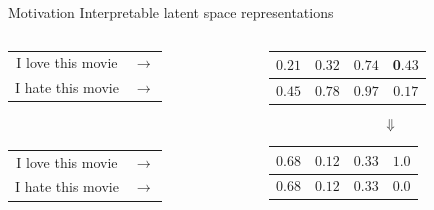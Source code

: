 \documentclass{beamer}
\begin{document}
\begin{frame}{Motivation}
  \centering
  {\LARGE Interpretable latent space representations} \\
  \vspace{1cm}
  \begin{columns}[T] %
    \begin{column}{.3\textwidth}
      \centering
      \begin{tabular}{ c c }
        I love this movie & $\rightarrow$ \\
        I hate this movie & $\rightarrow$ \\
      \end{tabular}\\
      \vspace{1.8cm}
      \begin{tabular}{ c c }
        I love this movie & $\rightarrow$ \\
        I hate this movie & $\rightarrow$ \\
      \end{tabular}
    \end{column}
    \hfill
    \begin{column}{.6\textwidth}
      \centering
      \begin{tabular}{ | c | c | c | c | }
        \hline
        $0.21$ & $0.32$ & $0.74$ & 0$.43$ \\
        \hline
        $0.45$ & $0.78$ & $0.97$ & 0$.17$ \\
        \hline
      \end{tabular}
      {\Huge$$\Downarrow$$}
      \begin{tabular}{ | c | c | c | c | }
        \hline
        $0.68$ & $0.12$ & $0.33$ & {\color{red}$1.0$} \\
        \hline
        \hline
        $0.68$ & $0.12$ & $0.33$ & {\color{red}$0.0$} \\
        \hline
      \end{tabular}
    \end{column}
  \end{columns}
\end{frame}
\end{document}
